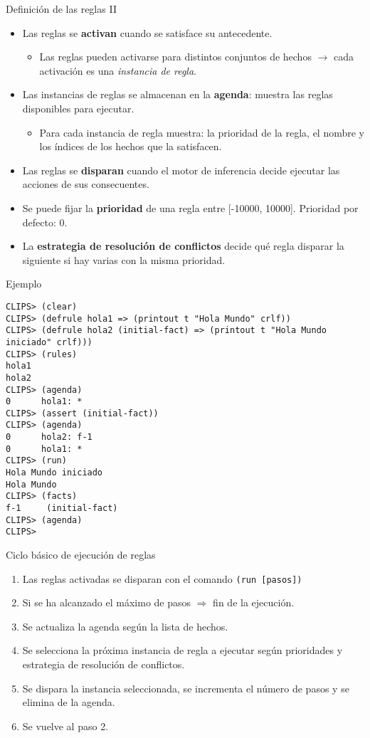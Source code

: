 \documentclass[usenames,dvipsnames,aspectratio=169]{beamer}
\begin{document}
\begin{frame}{Definición de las reglas II}
	\begin{itemize}
		\item Las reglas se \textbf{activan} cuando se satisface su antecedente.
		\begin{itemize}
			\item Las reglas pueden activarse para distintos conjuntos de hechos $\rightarrow$ cada activación es una \textit{instancia de regla}.
		\end{itemize}
		\item Las instancias de reglas se almacenan en la \textbf{agenda}: muestra las reglas disponibles para ejecutar.
		\begin{itemize}
			\item Para cada instancia de regla muestra: la prioridad de la regla, el nombre y los índices de los hechos que la satisfacen.
		\end{itemize}
		\item Las reglas se \textbf{disparan} cuando el motor de inferencia decide ejecutar las acciones de sus consecuentes.
		\item Se puede fijar la \textbf{prioridad} de una regla entre [-10000, 10000]. Prioridad por defecto: 0.
		\item La \textbf{estrategia de resolución de conflictos} decide qué regla disparar la siguiente si hay varias con la misma prioridad. 
	\end{itemize}
\end{frame}

\begin{frame}[fragile]{Ejemplo}
	\footnotesize
		\begin{verbatim}
CLIPS> (clear)
CLIPS> (defrule hola1 => (printout t "Hola Mundo" crlf))
CLIPS> (defrule hola2 (initial-fact) => (printout t "Hola Mundo iniciado" crlf)))
CLIPS> (rules)
hola1
hola2
CLIPS> (agenda)
0      hola1: *
CLIPS> (assert (initial-fact))
CLIPS> (agenda)
0      hola2: f-1
0      hola1: *
CLIPS> (run)
Hola Mundo iniciado
Hola Mundo
CLIPS> (facts)
f-1     (initial-fact)
CLIPS> (agenda)
CLIPS>
		\end{verbatim}
\end{frame}

\begin{frame}{Ciclo básico de ejecución de reglas}
	\begin{enumerate}
		\item Las reglas activadas se disparan con el comando \texttt{(run [pasos])}
		\item Si se ha alcanzado el máximo de pasos $\Rightarrow$ fin de la ejecución.
		\item Se actualiza la agenda según la lista de hechos.
		\item Se selecciona la próxima instancia de regla a ejecutar según prioridades y estrategia de resolución de conflictos.
		\item Se dispara la instancia seleccionada, se incrementa el número de pasos y se elimina de la agenda.
		\item Se vuelve al paso 2.
	\end{enumerate}
\end{frame}
\end{document}
